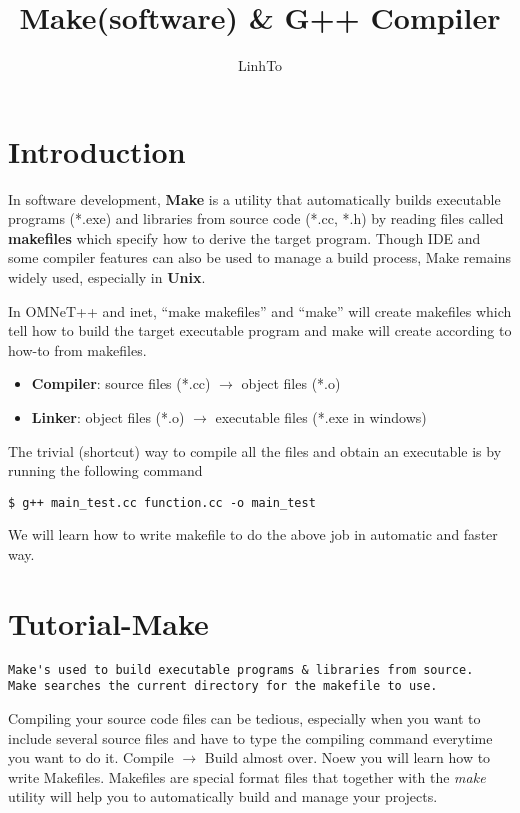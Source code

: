 \documentclass[10pt,a4paper,draft,onecolumn]{article}
\author{LinhTo}
\title{Make(software) \& G++ Compiler}
\begin{document}
\maketitle

\section{Introduction}
In software development, \textbf{Make} is a utility that automatically builds executable programs (*.exe) and libraries from source code (*.cc, *.h) by reading files called \textbf{makefiles} which specify how to derive the target program. Though IDE and some compiler features can also be used to manage a build process, Make remains widely used, especially in \textbf{Unix}.

In OMNeT++ and inet, ``make makefiles'' and ``make'' will create makefiles which tell how to build the target executable program and make will create according to how-to from makefiles.

\begin{itemize}
\item \textbf{Compiler}: source files (*.cc) $\rightarrow$ object files (*.o)
\item \textbf{Linker}: object files (*.o) $\rightarrow$ executable files (*.exe in windows)
\end{itemize}

The trivial (shortcut) way to compile all the files and obtain an executable is by running the following command
\begin{verbatim}
$ g++ main_test.cc function.cc -o main_test
\end{verbatim}

We will learn how to write makefile to do the above job in automatic and faster way.

\section{Tutorial-Make}

\begin{verbatim}
Make's used to build executable programs & libraries from source.
Make searches the current directory for the makefile to use.
\end{verbatim}

Compiling your source code files can be tedious, especially when you want to include several source files and have to type the compiling command everytime you want to do it. Compile $\rightarrow$ Build almost over. Noew you will learn how to write Makefiles. Makefiles are special format files that together with the \textit{make} utility will help you to automatically build and manage your projects.
\end{document}
